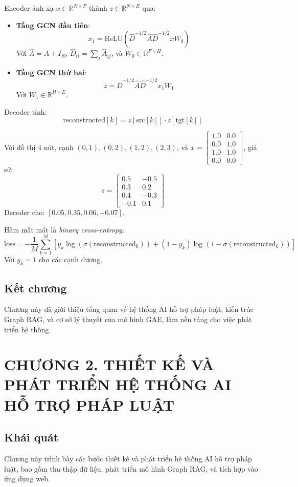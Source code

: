 \documentclass[a4paper,12pt]{article}
\begin{document}
Encoder ánh xạ \( x \in \mathbb{R}^{N \times F} \) thành \( z \in \mathbb{R}^{N \times E} \) qua:
\begin{itemize}
    \item \textbf{Tầng GCN đầu tiên}:
    \[
    x_1 = \text{ReLU}(\hat{D}^{-1/2} \hat{A} \hat{D}^{-1/2} x W_0)
    \]
    Với \( \hat{A} = A + I_N \), \( \hat{D}_{ii} = \sum_j \hat{A}_{ij} \), và \( W_0 \in \mathbb{R}^{F \times H} \).
    \item \textbf{Tầng GCN thứ hai}:
    \[
    z = \hat{D}^{-1/2} \hat{A} \hat{D}^{-1/2} x_1 W_1
    \]
    Với \( W_1 \in \mathbb{R}^{H \times E} \).
\end{itemize}
Decoder tính:
\[
\text{reconstructed}[k] = z[\text{src}[k]] \cdot z[\text{tgt}[k]]
\]

Với đồ thị 4 nút, cạnh \((0,1), (0,2), (1,2), (2,3)\), và \( x = \begin{bmatrix} 1.0 & 0.0 \\ 0.0 & 1.0 \\ 1.0 & 1.0 \\ 0.0 & 0.0 \end{bmatrix} \), giả sử:
\[
z = \begin{bmatrix} 0.5 & -0.5 \\ 0.3 & 0.2 \\ 0.4 & -0.3 \\ -0.1 & 0.1 \end{bmatrix}
\]
Decoder cho: \([0.05, 0.35, 0.06, -0.07]\).

Hàm mất mát là \textit{binary cross-entropy}:
\[
\text{loss} = -\frac{1}{M} \sum_{k=1}^{M} \left[ y_k \log(\sigma(\text{reconstructed}_k)) + (1 - y_k) \log(1 - \sigma(\text{reconstructed}_k)) \right]
\]
Với \( y_k = 1 \) cho các cạnh dương.

\subsection{Kết chương}
Chương này đã giới thiệu tổng quan về hệ thống AI hỗ trợ pháp luật, kiến trúc Graph RAG, và cơ sở lý thuyết của mô hình GAE, làm nền tảng cho việc phát triển hệ thống.
\clearpage

\section{CHƯƠNG 2. THIẾT KẾ VÀ PHÁT TRIỂN HỆ THỐNG AI HỖ TRỢ PHÁP LUẬT}
\subsection{Khái quát}
Chương này trình bày các bước thiết kế và phát triển hệ thống AI hỗ trợ pháp luật, bao gồm thu thập dữ liệu, phát triển mô hình Graph RAG, và tích hợp vào ứng dụng web.
\end{document}
